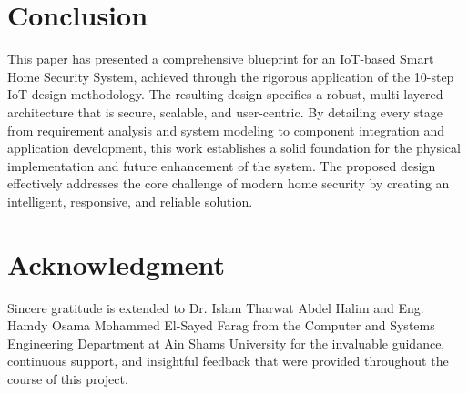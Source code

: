 \documentclass[conference]{IEEEtran}
\begin{document}


\section{Conclusion}
This paper has presented a comprehensive blueprint for an IoT-based Smart Home Security System, achieved through the rigorous application of the 10-step IoT design methodology. The resulting design specifies a robust, multi-layered architecture that is secure, scalable, and user-centric. By detailing every stage from requirement analysis and system modeling to component integration and application development, this work establishes a solid foundation for the physical implementation and future enhancement of the system. The proposed design effectively addresses the core challenge of modern home security by creating an intelligent, responsive, and reliable solution.


\section*{Acknowledgment}
Sincere gratitude is extended to Dr. Islam Tharwat Abdel Halim and Eng. Hamdy Osama Mohammed El-Sayed Farag from the Computer and Systems Engineering Department at Ain Shams University for the invaluable guidance, continuous support, and insightful feedback that were provided throughout the course of this project.




\end{document}
